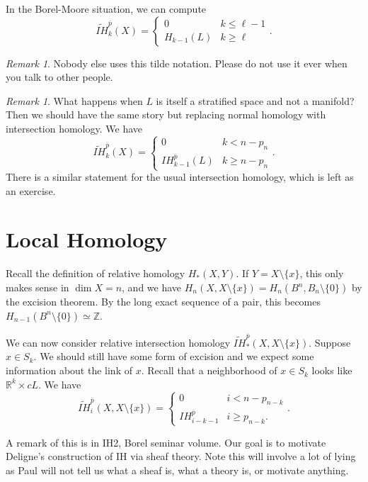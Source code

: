 \documentclass[leqno, openany]{memoir}
\theoremstyle{definition}
\theoremstyle{remark}
\newtheorem{rmk}[thm]{Remark}
\theoremstyle{plain}
\theoremstyle{definition}
\theoremstyle{remark}
\newcommand{\R}{\mathbb{R}}
\newcommand{\Z}{\mathbb{Z}}
\begin{document}
In the Borel-Moore situation, we can compute
\[ \widetilde{IH}_k^{\overline{p}}(X) = \begin{cases}
    0 & k \leq \ell - 1 \\
    H_{k-1}(L) & k \geq \ell
\end{cases}. \]
\begin{rmk}
    Nobody else uses this tilde notation. Please do not use it ever when you talk to other people.
\end{rmk}

\begin{rmk}
    What happens when $L$ is itself a stratified space and not a manifold? Then we should have the same story but replacing normal homology with intersection homology. We have
    \[ \widetilde{IH}_k^{\overline{p}}(X) = \begin{cases}
        0 & k < n - p_n \\
        IH_{k-1}^{\overline{p}}(L) & k \geq n - p_n
    \end{cases}. \]
    There is a similar statement for the usual intersection homology, which is left as an exercise.
\end{rmk}

\section{Local Homology}%
\label{sec:local_homology-2}

Recall the definition of relative homology $H_*(X,Y)$. If $Y = X \setminus \{ x \}$, this only makes sense in $\dim X = n$, and we have $H_n(X, X \setminus \{x\}) = H_n(B^n, B_n \setminus \{0\})$ by the excision theorem. By the long exact sequence of a pair, this becomes $H_{n-1}(B^n \setminus \{0\}) \simeq \Z$. 

We can now consider relative intersection homology $\widetilde{IH}_*^{\overline{p}}(X, X \setminus \{ x \})$. Suppose $x \in S_k$. We should still have some form of excision and we expect some information about the link of $x$. Recall that a neighborhood of $x \in S_k$ looks like $\R^k \times cL$. We have
\[ \widetilde{IH}_i^{\overline{p}}(X, X \setminus \{x \}) = \begin{cases}
    0 & i < n - p_{n-k} \\
    IH_{i-k-1}^{\overline{p}} & i \geq p_{n-k}.
\end{cases}. \]

A remark of this is in IH2, Borel seminar volume. Our goal is to motivate Deligne's construction of IH via sheaf theory. Note this will involve a lot of lying as Paul will not tell us what a sheaf is, what a theory is, or motivate anything.
\end{document}
